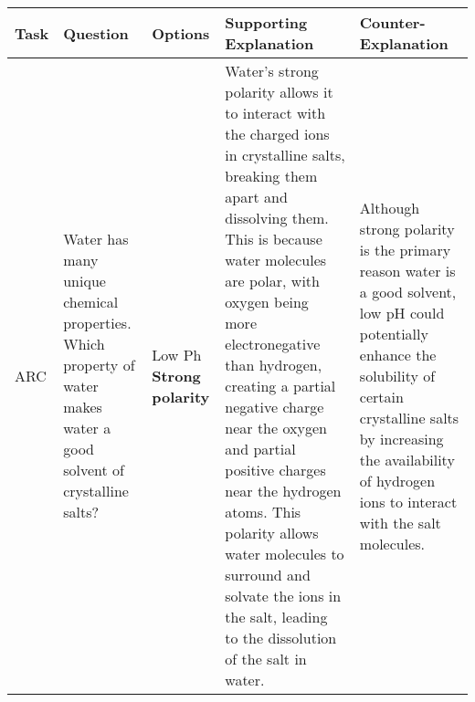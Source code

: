 \begin{table*}[ht]
    \centering
    \small
    \begin{tabular}{p{} p{}  p{} p{} p{}}
         \toprule
         Task & Question & Options & Supporting Explanation & Counter-Explanation \\
         \midrule
         ARC & Water has many unique chemical properties. Which property of water makes water a good solvent of crystalline salts? & Low Ph \newline \textbf{Strong polarity} & Water's strong polarity allows it to interact with the charged ions in crystalline salts, breaking them apart and dissolving them. This is because water molecules are polar, with oxygen being more electronegative than hydrogen, creating a partial negative charge near the oxygen and partial positive charges near the hydrogen atoms. This polarity allows water molecules to surround and solvate the ions in the salt, leading to the dissolution of the salt in water. & Although strong polarity is the primary reason water is a good solvent, low pH could potentially enhance the solubility of certain crystalline salts by increasing the availability of hydrogen ions to interact with the salt molecules. \\
         \midrule 

\end{tabular}
\end{table*}
